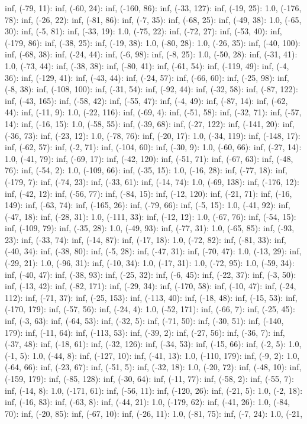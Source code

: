 \documentclass[parskip=half]{scrartcl}
\begin{document}
inf, (-79, 11): inf, (-60, 24): inf, (-160, 86): inf, (-33, 127): inf, (-19, 25): 1.0, (-176, 78): inf, (-26, 22): inf, (-81, 86): inf, (-7, 35): inf, (-68, 25): inf, (-49, 38): 1.0, (-65, 30): inf, (-5, 81): inf, (-33, 19): 1.0, (-75, 22): inf, (-72, 27): inf, (-53, 40): inf, (-179, 86): inf, (-38, 25): inf, (-19, 38): 1.0, (-80, 28): 1.0, (-26, 35): inf, (-40, 100): inf, (-68, 38): inf, (-24, 44): inf, (-6, 98): inf, (-8, 25): 1.0, (-50, 28): inf, (-31, 41): 1.0, (-73, 44): inf, (-38, 38): inf, (-80, 41): inf, (-61, 54): inf, (-119, 49): inf, (-4, 36): inf, (-129, 41): inf, (-43, 44): inf, (-24, 57): inf, (-66, 60): inf, (-25, 98): inf, (-8, 38): inf, (-108, 100): inf, (-31, 54): inf, (-92, 44): inf, (-32, 58): inf, (-87, 122): inf, (-43, 165): inf, (-58, 42): inf, (-55, 47): inf, (-4, 49): inf, (-87, 14): inf, (-62, 44): inf, (-11, 9): 1.0, (-22, 116): inf, (-69, 4): inf, (-51, 58): inf, (-32, 71): inf, (-57, 14): inf, (-16, 15): 1.0, (-58, 55): inf, (-39, 68): inf, (-27, 122): inf, (-141, 20): inf, (-36, 73): inf, (-23, 12): 1.0, (-78, 76): inf, (-20, 17): 1.0, (-34, 119): inf, (-148, 17): inf, (-62, 57): inf, (-2, 71): inf, (-104, 60): inf, (-30, 9): 1.0, (-60, 66): inf, (-27, 14): 1.0, (-41, 79): inf, (-69, 17): inf, (-42, 120): inf, (-51, 71): inf, (-67, 63): inf, (-48, 76): inf, (-54, 2): 1.0, (-109, 66): inf, (-35, 15): 1.0, (-16, 28): inf, (-77, 18): inf, (-179, 7): inf, (-74, 23): inf, (-33, 61): inf, (-14, 74): 1.0, (-69, 138): inf, (-176, 12): inf, (-42, 12): inf, (-56, 77): inf, (-84, 15): inf, (-12, 120): inf, (-21, 71): inf, (-16, 149): inf, (-63, 74): inf, (-165, 26): inf, (-79, 66): inf, (-5, 15): 1.0, (-41, 92): inf, (-47, 18): inf, (-28, 31): 1.0, (-111, 33): inf, (-12, 12): 1.0, (-67, 76): inf, (-54, 15): inf, (-109, 79): inf, (-35, 28): 1.0, (-49, 93): inf, (-77, 31): 1.0, (-65, 85): inf, (-93, 23): inf, (-33, 74): inf, (-14, 87): inf, (-17, 18): 1.0, (-72, 82): inf, (-81, 33): inf, (-40, 34): inf, (-38, 80): inf, (-5, 28): inf, (-47, 31): inf, (-70, 47): 1.0, (-13, 29): inf, (-29, 21): 1.0, (-96, 31): inf, (-10, 34): 1.0, (-17, 31): 1.0, (-72, 95): 1.0, (-59, 34): inf, (-40, 47): inf, (-38, 93): inf, (-25, 32): inf, (-6, 45): inf, (-22, 37): inf, (-3, 50): inf, (-13, 42): inf, (-82, 171): inf, (-29, 34): inf, (-170, 58): inf, (-10, 47): inf, (-24, 112): inf, (-71, 37): inf, (-25, 153): inf, (-113, 40): inf, (-18, 48): inf, (-15, 53): inf, (-170, 179): inf, (-57, 56): inf, (-24, 4): 1.0, (-52, 171): inf, (-66, 7): inf, (-25, 45): inf, (-3, 63): inf, (-64, 53): inf, (-32, 5): inf, (-71, 50): inf, (-30, 51): inf, (-140, 179): inf, (-11, 64): inf, (-113, 53): inf, (-39, 2): inf, (-27, 56): inf, (-36, 7): inf, (-37, 48): inf, (-18, 61): inf, (-32, 126): inf, (-34, 53): inf, (-15, 66): inf, (-2, 5): 1.0, (-1, 5): 1.0, (-44, 8): inf, (-127, 10): inf, (-41, 13): 1.0, (-110, 179): inf, (-9, 2): 1.0, (-64, 66): inf, (-23, 67): inf, (-51, 5): inf, (-32, 18): 1.0, (-20, 72): inf, (-48, 10): inf, (-159, 179): inf, (-85, 128): inf, (-30, 64): inf, (-11, 77): inf, (-58, 2): inf, (-55, 7): inf, (-14, 8): 1.0, (-171, 61): inf, (-56, 11): inf, (-120, 26): inf, (-21, 5): 1.0, (-2, 18): inf, (-16, 83): inf, (-63, 8): inf, (-44, 21): 1.0, (-179, 62): inf, (-41, 26): 1.0, (-84, 70): inf, (-20, 85): inf, (-67, 10): inf, (-26, 11): 1.0, (-81, 75): inf, (-7, 24): 1.0, (-21, 
\end{document}
